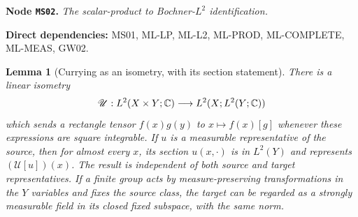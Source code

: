 \documentclass[11pt,a4paper]{article}
\newtheorem{lemma}[theorem]{Lemma}
\theoremstyle{remark}\newtheorem{remark}[theorem]{Remark}
\newcommand{\node}[3]{\par\Needspace{6\baselineskip}\smallskip\hypertarget{node:#1}{}\label{nodepage:#1}\noindent\textbf{Node \texttt{#1}.} \textit{#2.}\par\noindent\textbf{Direct dependencies:} #3.\par}
\begin{document}
\node{MS02}{The scalar-product to Bochner-$L^2$ identification}{MS01, ML-LP, ML-L2, ML-PROD, ML-COMPLETE, ML-MEAS, GW02}
\begin{lemma}[Currying as an isometry, with its section statement]\label{lem:L2curry}
There is a linear isometry
\[
 \mathscr U:L^2(X\times Y;\mathbb C)\longrightarrow L^2(X;L^2(Y;\mathbb C))
\]
which sends a rectangle tensor $f(x)g(y)$ to $x\mapsto f(x)[g]$ whenever these expressions are square integrable. If $u$ is a measurable representative of the source, then for almost every $x$, its section $u(x,\cdot)$ is in $L^2(Y)$ and represents $(\mathscr U[u])(x)$. The result is independent of both source and target representatives. If a finite group acts by measure-preserving transformations in the $Y$ variables and fixes the source class, the target can be regarded as a strongly measurable field in its closed fixed subspace, with the same norm.
\end{lemma}
\end{document}
